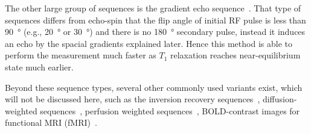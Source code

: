 The other large group of sequences is the gradient echo sequence~\cite{winkler_characteristics_1988}. That type of sequences differs from echo-spin that the flip angle of initial RF pulse is less than \SI{90}{\degree} (e.g., \SI{20}{\degree} or \SI{30}{\degree}) and there is no \SI{180}{\degree} secondary pulse, instead it induces an echo by the spacial gradients explained later. Hence this method is able to perform the measurement much faster as $T_1$ relaxation reaches near-equilibrium state much earlier.

Beyond these sequence types, several other commonly used variants exist, which will not be discussed here, such as the inversion recovery sequences~\cite{dwyer_short-ti_1988, fleckenstein_fast_1991, ashgriz_flair_1991, bedell_implementation_1998}, diffusion-weighted sequences~\cite{moseley_diffusion-weighted_1990, bammer_basic_2003}, perfusion weighted sequences~\cite{rosen_perfusion_1990, detre_perfusion_1992, barbier_methodology_2001}, BOLD-contrast images for functional MRI (fMRI)~\cite{ogawa_brain_1990, kwong_dynamic_1992}.

